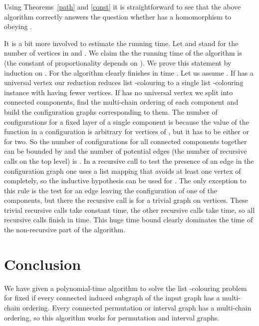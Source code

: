 \documentclass[12pt]{llncs}
\begin{document}
Using Theorems~\ref{path} and \ref{const} it is
straightforward to see that the above algorithm correctly answers the
question whether  has a homomorphism to  obeying .

It is a bit more involved to estimate the running time. Let  and  stand
for the number of vertices in  and . We claim the the running time of the
algorithm is  (the constant of proportionality depends on
). We prove
this statement by induction on . For  the algorithm clearly
finishes in time . Let us assume . If  has a universal
vertex our reduction reduces list -colouring to a single list -colouring
instance with  having fewer vertices. If  has no universal vertex we
split  into connected components, find the multi-chain ordering of each
component and build the configuration graphs corresponding to them. The
number of configurations for a fixed layer  of a single component is
 because the value of the function  in a configuration
 is arbitrary for  vertices of , but it has to be either  or
 for two. So the number of configurations for all connected components
together can be bounded by  and the number of potential edges (the
number of recursive calls on the top level) is . In a
recursive call to test the presence of an edge in the configuration graph one
uses a list mapping that avoids at least one vertex of  completely, so the
inductive hypothesis can be used for . The only exception to this
rule is the test for an edge leaving the configuration  of one of the
components,  but there the recursive call is for a
trivial graph on  vertices. These trivial recursive calls
take constant time, the other recursive calls take
 time, so all recursive calls finish in
 time. This huge time bound
clearly dominates the time of the non-recursive part of the algorithm.

\section{Conclusion}
We have given a polynomial-time algorithm to solve the list -colouring
problem for fixed  if every connected induced subgraph of the input graph
has a multi-chain ordering. Every connected permutation or interval graph has
a multi-chain ordering, so this algorithm works for permutation and interval
graphs.


\end{document}
